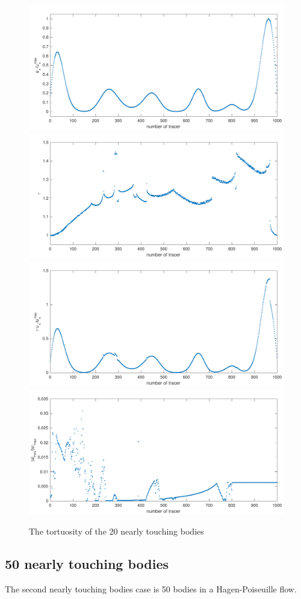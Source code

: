 \documentclass[preprint, 10pt]{elsarticle}
\begin{document}
\begin{figure}[H]
\begin{center}
\includegraphics[width = 0.45 \textwidth]{./figs/velocity_loc}
\includegraphics[width = 0.45 \textwidth]{./figs/tort_local}\\

\includegraphics[width = 0.45 \textwidth]{./figs/tortU_local}
\includegraphics[width = 0.45 \textwidth]{./figs/uminDumax}

\caption{The tortuosity of the 20 nearly touching bodies}
\end{center}
\end{figure}

\subsection{50 nearly touching bodies}
{\color{red}
The second nearly touching bodies case is 50 bodies in a Hagen-Poiseuille flow.
}
\end{document}
